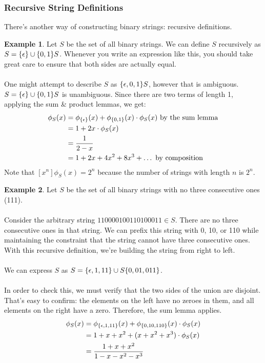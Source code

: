 \documentclass[]{article}
\theoremstyle{definition}
\newtheorem{ex}{Example}[section]
\newcommand{\lecture}[1]{\marginpar{{\footnotesize $\leftarrow$ \underline{#1}}}}
\DeclarePairedDelimiter{\set}{\lbrace}{\rbrace}
\begin{document}
			\subsubsection{Recursive String Definitions}
				There's another way of constructing binary strings: recursive definitions.
				\begin{ex} \lecture{February 1, 2013}
					Let $S$ be the set of all binary strings. We can define $S$ recursively as $S = \set{\epsilon } \cup \set{0, 1} S$. Whenever you write an expression like this, you should take great care to ensure that both sides are actually equal.
					\\ \\
					One might attempt to describe $S$ as $\set{\epsilon, 0, 1 }S$, however that is ambiguous. $S = \set{\epsilon } \cup \set{0, 1 } S$ is unambiguous. Since there are two terms of length 1, applying the sum \& product lemmas, we get:
					\begin{align*}
						\phi_S(x) &= \phi_{\set{\epsilon}}(x) + \phi_{\set{0, 1}}(x) \cdot \phi_S(x) \text{ by the sum lemma} \\
						&= 1 + 2x \cdot \phi_S(x) \\
						&= \frac{1}{2 - x} \\
						&= 1 + 2x + 4x^2 + 8x^3 + \ldots \text{ by composition}
					\end{align*}
					Note that $[x^n]\phi_S(x) = 2^n$ because the number of strings with length $n$ is $2^n$.
				\end{ex}

				\begin{ex}
					Let $S$ be the set of all binary strings with no three consecutive ones (111).
					\\ \\
					Consider the arbitrary string $110000100110100011 \in S$. There are no three consecutive ones in that string. We can prefix this string with 0, 10, or 110 while maintaining the constraint that the string cannot have three consecutive ones. With this recursive definition, we're building the string from right to left.
					\\ \\
					We can express $S$ as $S = \set{\epsilon, 1, 11 } \cup S\set{0, 01, 011}$.
					\\ \\
					In order to check this, we must verify that the two sides of the union are disjoint. That's easy to confirm: the elements on the left have no zeroes in them, and all elements on the right have a zero. Therefore, the sum lemma applies.
					\begin{align*}
						\phi_S(x) &= \phi_{\set{\epsilon, 1, 11}}(x) + \phi_{\set{0, 10, 110}}(x) \cdot \phi_S(x) \\
						&= 1 + x + x^2 + (x + x^2 + x^3) \cdot \phi_S(x) \\
						&= \frac{1 + x + x^2}{1 - x - x^2 - x^3}
					\end{align*}
				\end{ex}
\end{document}
